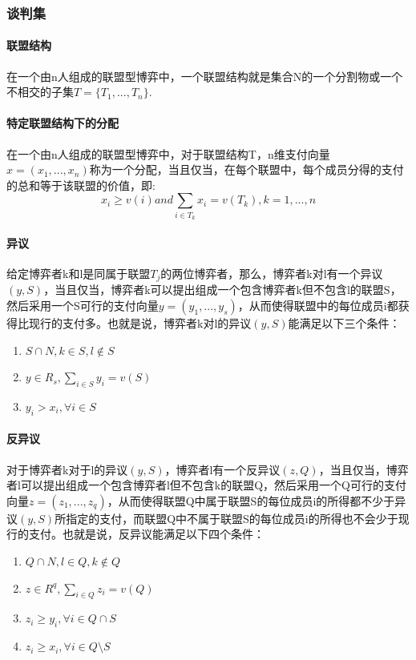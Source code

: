 \documentclass[12pt,a4paper]{article}
\begin{document}
\subsubsection{谈判集}
\paragraph{联盟结构} 在一个由n人组成的联盟型博弈中，一个联盟结构就是集合N的一个分割物或一个不相交的子集$T=\{T_1,...,T_n\}$.

\paragraph{特定联盟结构下的分配} 在一个由n人组成的联盟型博弈中，对于联盟结构T，n维支付向量$x=(x_1,...,x_n)$称为一个分配，当且仅当，在每个联盟中，每个成员分得的支付的总和等于该联盟的价值，即:
\begin{equation}
	x_i \geq v({i}) and \sum_{i \in T_k} x_i = v(T_k), k=1,...,n
\end{equation}

\paragraph{异议} 给定博弈者k和l是同属于联盟$T_j$的两位博弈者，那么，博弈者k对l有一个异议$(y,S)$，当且仅当，博弈者k可以提出组成一个包含博弈者k但不包含l的联盟S，然后采用一个S可行的支付向量$y=(y_1,...,y_s)$，从而使得联盟中的每位成员i都获得比现行的支付多。也就是说，博弈者k对l的异议$(y,S)$能满足以下三个条件：
\begin{enumerate}
	\item $S \cap N, k \in S, l \notin S$
	\item $y \in R_s, \sum_{i \in S}y_i = v(S)$
	\item $y_i > x_i, \forall i \in S$
\end{enumerate}

\paragraph{反异议} 对于博弈者k对于l的异议$(y,S)$，博弈者l有一个反异议$(z,Q)$，当且仅当，博弈者l可以提出组成一个包含博弈者l但不包含k的联盟Q，然后采用一个Q可行的支付向量$z=(z_1,...,z_q)$，从而使得联盟Q中属于联盟S的每位成员i的所得都不少于异议$(y,S)$所指定的支付，而联盟Q中不属于联盟S的每位成员i的所得也不会少于现行的支付。也就是说，反异议能满足以下四个条件：
\begin{enumerate}
	\item $Q \cap N, l \in Q, k \notin Q $
	\item $z \in R^q, \sum_{i \in Q} z_i = v(Q) $
	\item $z_i \geq y_i, \forall i \in Q \cap S $
	\item $z_i \geq x_i, \forall i \in Q \setminus S $
\end{enumerate}
\end{document}
